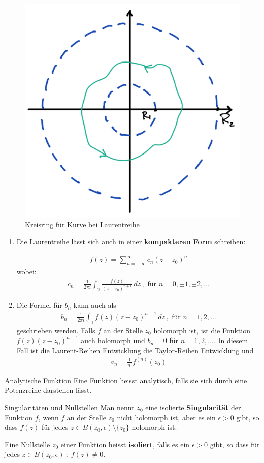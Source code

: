 \documentclass[a4paper,10pt]{article}
\begin{document}
\begin{figure}[H]
  \centering 
  \includegraphics[width=0.4\linewidth]{assets/4-1-1.png}
  \caption{Kreisring für Kurve bei Laurentreihe}
\end{figure}

\begin{enumerate}
  \item{
    Die Laurentreihe lässt sich auch in einer \textbf{kompakteren Form} schreiben:

    \begin{align*} 
       f(z) = \sum_{n=-\infty}^{\infty} c_n (z-z_0)^n
     \end{align*}
     wobei:
     \begin{align*}
      c_n=\frac{1}{2\pi i}\int_\gamma\frac{f(z)}{(z-z_0)^{n+1}}\,dz\,,\text{ für } n=0,\pm1,\pm2,\dots
    \end{align*}
  }

  \item{
    Die Formel für \(b_n\) kann auch als 
    \begin{align*} b_n=\frac{1}{2\pi i}\int_\gamma f(z)(z-z_0)^{n-1}\,dz\,,\text{ für } n=1,2,\dots \end{align*} geschrieben werden. Falls \(f\) an der Stelle \(z_0\) holomorph ist, ist die Funktion \(f(z)(z-z_0)^{n-1}\) auch holomorph und \(b_n=0\) für \(n=1,2,\dots\). In diesem Fall ist die Laurent-Reihen Entwicklung die Taylor-Reihen Entwicklung und \begin{align*} a_n=\frac{1}{n!}f^{( n )}(z_0) \end{align*}
  }
\end{enumerate}

\begin{subbox}{Analytische Funktion}
  Eine Funktion heisst analytisch, falls sie sich durch eine Potenzreihe darstellen lässt.
\end{subbox}

\begin{subbox}{Singularitäten und Nullstellen}
  Man nennt \(z_0\) eine isolierte \textbf{Singularität} der Funktion \(f\), wenn \(f\) an der Stelle \(z_0\) nicht holomorph ist, aber es ein \(\epsilon>0\) gibt, so dass \(f(z)\) für jedes \(z\in B(z_0,\epsilon)\setminus \{ z_0 \}\) holomorph ist.
  
  Eine Nullstelle \(z_0\) einer Funktion heisst \textbf{isoliert}, falls es ein \(\epsilon>0\) gibt, so dass für jedes \(z\in B(z_0,\epsilon)\) : \(f(z)\neq0\).
\end{subbox}
\end{document}

